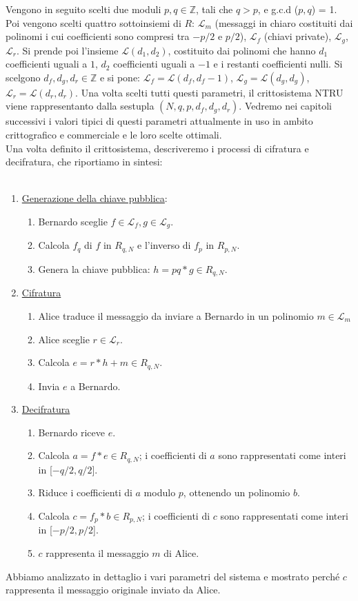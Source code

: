 \documentclass[a4paper,12pt]{report}
\theoremstyle{plain}
\theoremstyle{definition}
\theoremstyle{remark}
\begin{document}
Vengono in seguito scelti due moduli $p,q \in \mathbb{Z}$, tali che $q>p$, e g.c.d ($p,q$) = 1.
Poi vengono scelti quattro sottoinsiemi di $R$: $\mathcal{L}_{m}$ (messaggi in chiaro costituiti dai polinomi i cui coefficienti sono compresi tra $-p/2 $ e $p/2$), $\mathcal{L}_{f}$ (chiavi private), $\mathcal{L}_{g}$,
$\mathcal{L}_{r}$.
Si prende poi l'insieme $\mathcal{L}(d_1,d_2)$, costituito dai polinomi che hanno $d_1$ coefficienti uguali a $1$, $d_2$ coefficienti uguali a $-1$ e i restanti coefficienti nulli. Si scelgono $d_f, d_g, d_r \in \mathbb{Z}$ e si pone: $\mathcal{L}_f=\mathcal{L}(d_f,d_f-1)$,
$\mathcal{L}_g=\mathcal{L}(d_g,d_g)$, $\mathcal{L}_r=\mathcal{L}(d_r,d_r)$. Una volta scelti tutti questi parametri, il crittosistema NTRU viene rappresentanto dalla sestupla $(N, q, p, d_f, d_g, d_r)$. Vedremo nei capitoli successivi i valori tipici di questi parametri attualmente in uso in ambito crittografico e commerciale e le loro scelte ottimali.\\
Una volta definito il crittosistema, descriveremo i processi di cifratura e decifratura, che riportiamo in sintesi:\\
\\ 
\begin{enumerate}
\item \underline{Generazione della chiave pubblica}:
\begin{enumerate}
\item Bernardo sceglie $f\in \mathcal{L}_f, g\in \mathcal{L}_g$.
\item Calcola $f_q$ di $f$ in $R_{q,N}$ e l'inverso di $f_p$ in $R_{p,N}$.
\item Genera la chiave pubblica: $h=pq\ast g \in R_{q,N}$.
\end{enumerate}
\item \underline{Cifratura}
\begin {enumerate}
\item Alice traduce il messaggio da inviare a Bernardo in un polinomio $m\in \mathcal{L}_m$
\item Alice sceglie $r\in \mathcal{L}_r$.
\item Calcola $e=r\ast h+m \in R_{q,N}$.
\item Invia $e$ a Bernardo.
\end {enumerate}
\item \underline{Decifratura}
\begin{enumerate}
\item Bernardo riceve $e$.
\item Calcola $a=f\ast e\in R_{q,N}$; i coefficienti di $a$ sono rappresentati come interi in [$-q/2,q/2$].
\item Riduce i coefficienti di $a$ modulo $p$, ottenendo un polinomio $b$.
\item Calcola $c=f_p\ast b\in R_{p,N}$; i coefficienti di $c$ sono rappresentati come interi in [$-p/2,p/2$].
\item $c$ rappresenta il messaggio $m$ di Alice.
\end {enumerate}
\end {enumerate}
Abbiamo analizzato in dettaglio i vari parametri del sistema e mostrato perch\'e $c$ rappresenta il messaggio originale inviato da Alice.
\\  
\end{document}

